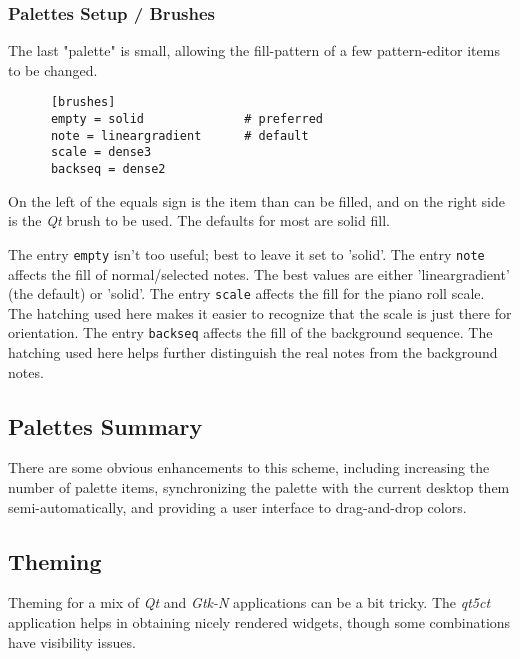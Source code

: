 \subsubsection{Palettes Setup / Brushes}
\label{subsubsec:palettes_setup_brushes}

   The last "palette" is small, allowing the fill-pattern of a few pattern-editor
   items to be changed.

   \begin{verbatim}
      [brushes]
      empty = solid              # preferred
      note = lineargradient      # default
      scale = dense3
      backseq = dense2
   \end{verbatim}

   On the left of the equals sign is the item than can be filled, and on the
   right side is the \textsl{Qt} brush to be used.  The defaults for most are
   solid fill.

   The entry \texttt{empty} isn't too useful; best to leave it set to 'solid'.
   The entry \texttt{note} affects the fill of normal/selected notes.
   The best values are either 'lineargradient' (the default) or 'solid'.
   The entry \texttt{scale} affects the fill for the piano roll scale.  The
   hatching used here makes it easier to recognize that the scale is just there
   for orientation.
   The entry \texttt{backseq} affects the fill of the background sequence.  The
   hatching used here helps further distinguish the real notes from the
   background notes.

\subsection{Palettes Summary}
\label{subsec:palettes_summary}

   There are some obvious enhancements to this scheme, including increasing the
   number of palette items, synchronizing the palette with the current desktop
   them semi-automatically, and providing a user interface to drag-and-drop
   colors.

\subsection{Theming}
\label{subsec:palettes_theming}

   Theming for a mix of \textsl{Qt} and \textsl{Gtk-N} applications can be a
   bit tricky.
   The \textsl{qt5ct} application helps in obtaining nicely rendered
   widgets, though some combinations have visibility issues.

